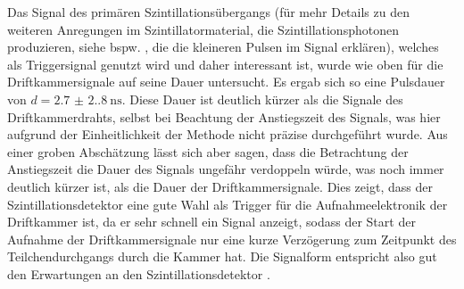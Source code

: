 Das Signal des primären Szintillationsübergangs (für mehr Details zu den weiteren Anregungen im Szintillatormaterial, die Szintillationsphotonen produzieren, siehe bspw. \cite[505-506]{kolanoskiwermerdetektoren}, die die  kleineren Pulsen im Signal erklären), welches als Triggersignal genutzt wird und daher interessant ist, wurde wie oben für die Driftkammersignale auf seine Dauer untersucht. Es ergab sich so eine Pulsdauer von $d=\SI{2.7(2.8)}{\nano\s}$. Diese Dauer ist deutlich kürzer als die Signale des Driftkammerdrahts, selbst bei Beachtung der Anstiegszeit des Signals, was hier aufgrund der Einheitlichkeit der Methode nicht präzise durchgeführt wurde. Aus einer groben Abschätzung lässt sich aber sagen, dass die Betrachtung der Anstiegszeit die Dauer des Signals ungefähr verdoppeln würde, was noch immer deutlich kürzer ist, als die Dauer der Driftkammersignale. Dies zeigt, dass der Szintillationsdetektor eine gute Wahl als Trigger für die Aufnahmeelektronik der Driftkammer ist, da er sehr schnell ein Signal anzeigt, sodass der Start der Aufnahme der Driftkammersignale nur eine kurze Verzögerung zum Zeitpunkt des Teilchendurchgangs durch die Kammer hat. Die Signalform entspricht also gut den Erwartungen an den Szintillationsdetektor \cite[505-507]{kolanoskiwermerdetektoren}\cite[21-22,45]{schwandiplom}.

